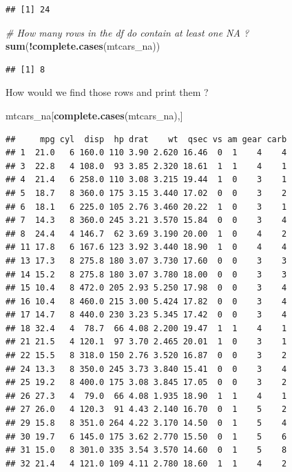 \documentclass[]{book}
\newenvironment{Shaded}{\begin{snugshade}}{\end{snugshade}}
\newcommand{\KeywordTok}[1]{\textcolor[rgb]{0.13,0.29,0.53}{\textbf{#1}}}
\newcommand{\CommentTok}[1]{\textcolor[rgb]{0.56,0.35,0.01}{\textit{#1}}}
\newcommand{\OperatorTok}[1]{\textcolor[rgb]{0.81,0.36,0.00}{\textbf{#1}}}
\newcommand{\NormalTok}[1]{#1}
\begin{document}
\begin{verbatim}
## [1] 24
\end{verbatim}

\begin{Shaded}
\begin{Highlighting}[]
\CommentTok{# How many rows in the df do contain at least one NA ?}
\KeywordTok{sum}\NormalTok{(}\OperatorTok{!}\KeywordTok{complete.cases}\NormalTok{(mtcars_na))}
\end{Highlighting}
\end{Shaded}

\begin{verbatim}
## [1] 8
\end{verbatim}

How would we find those rows and print them ?

\begin{Shaded}
\begin{Highlighting}[]
\NormalTok{mtcars_na[}\KeywordTok{complete.cases}\NormalTok{(mtcars_na),]}
\end{Highlighting}
\end{Shaded}

\begin{verbatim}
##     mpg cyl  disp  hp drat    wt  qsec vs am gear carb
## 1  21.0   6 160.0 110 3.90 2.620 16.46  0  1    4    4
## 3  22.8   4 108.0  93 3.85 2.320 18.61  1  1    4    1
## 4  21.4   6 258.0 110 3.08 3.215 19.44  1  0    3    1
## 5  18.7   8 360.0 175 3.15 3.440 17.02  0  0    3    2
## 6  18.1   6 225.0 105 2.76 3.460 20.22  1  0    3    1
## 7  14.3   8 360.0 245 3.21 3.570 15.84  0  0    3    4
## 8  24.4   4 146.7  62 3.69 3.190 20.00  1  0    4    2
## 11 17.8   6 167.6 123 3.92 3.440 18.90  1  0    4    4
## 13 17.3   8 275.8 180 3.07 3.730 17.60  0  0    3    3
## 14 15.2   8 275.8 180 3.07 3.780 18.00  0  0    3    3
## 15 10.4   8 472.0 205 2.93 5.250 17.98  0  0    3    4
## 16 10.4   8 460.0 215 3.00 5.424 17.82  0  0    3    4
## 17 14.7   8 440.0 230 3.23 5.345 17.42  0  0    3    4
## 18 32.4   4  78.7  66 4.08 2.200 19.47  1  1    4    1
## 21 21.5   4 120.1  97 3.70 2.465 20.01  1  0    3    1
## 22 15.5   8 318.0 150 2.76 3.520 16.87  0  0    3    2
## 24 13.3   8 350.0 245 3.73 3.840 15.41  0  0    3    4
## 25 19.2   8 400.0 175 3.08 3.845 17.05  0  0    3    2
## 26 27.3   4  79.0  66 4.08 1.935 18.90  1  1    4    1
## 27 26.0   4 120.3  91 4.43 2.140 16.70  0  1    5    2
## 29 15.8   8 351.0 264 4.22 3.170 14.50  0  1    5    4
## 30 19.7   6 145.0 175 3.62 2.770 15.50  0  1    5    6
## 31 15.0   8 301.0 335 3.54 3.570 14.60  0  1    5    8
## 32 21.4   4 121.0 109 4.11 2.780 18.60  1  1    4    2
\end{verbatim}
\end{document}
